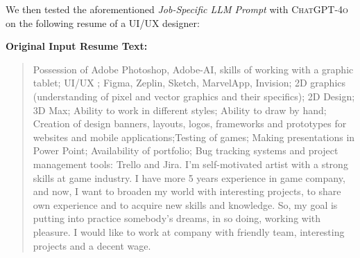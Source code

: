      We then tested the aforementioned \textit{Job-Specific LLM Prompt} with \textsc{ChatGPT-4o} on the following resume of a UI/UX designer:
   
        \textbf{Original Input Resume Text:} 
        \begin{quote}
            Possession of Adobe Photoshop, Adobe-AI, skills of working with a graphic tablet; UI/UX ;  Figma, Zeplin, Sketch, MarvelApp, Invision; 2D graphics (understanding of pixel and vector graphics and their specifics); 2D Design; 3D Max; Ability to work in different styles; Ability to draw by hand; Creation of design banners, layouts, logos, frameworks and prototypes for websites and mobile applications;Testing of games; Making presentations in Power Point;
            Availability of portfolio;
            Bug tracking systems and project management tools: Trello and Jira.
            I'm self-motivated artist with a strong skills at game industry. I have more 5 years experience in game company, and now, I want to broaden my world with interesting projects, to share own experience and to acquire new skills and knowledge.
            So, my goal is putting into practice somebody's dreams, in so doing, working with pleasure.
            I would like to work at company with friendly team, interesting projects and a decent wage.
        \end{quote}
        
